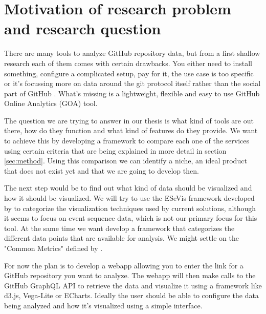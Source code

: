\documentclass[authoryear,preprint,review,12pt]{elsarticle}
\begin{document}
\begin{frontmatter}

\end{frontmatter}


\section{Motivation of research problem and research question}
\label{sec:motivation}

There are many tools to analyze GitHub repository data, but from a first shallow research each of
them comes with certain drawbacks. You either need to install something, configure a complicated
setup, pay for it, the use case is too specific or it's focussing more on data around the git
protocol itself rather than the social part of GitHub . What's missing is a lightweight, flexible
and easy to use GitHub Online Analytics (GOA) tool.

The question we are trying to answer in our thesis is what kind of tools are out there, how do they
function and what kind of features do they provide. We want to achieve this by developing a
framework to compare each one of the services using certain criteria that are being explained in
more detail in section \ref{sec:method}. Using this comparison we can identify a niche, an ideal
product that does not exist yet and that we are going to develop then.

The next step would be to find out what kind of data should be visualized and how it should be
visualized. We will try to use the ESeVis framework developed by
\citet{yeshchenkoSurveyApproachesEvent2022} to categorize the visualization techniques used by
current solutions, although it seems to focus on event sequence data, which is not our primary
focus for this tool. At the same time we want develop a framework that categorizes the different
data points that are available for analysis. We might settle on the "Common Metrics" defined by
\citet{CHAOSSCommonMetrics2022}.

For now the plan is to develop a webapp allowing you to enter the link for a GitHub repository you
want to analyze. The webapp will then make calls to the GitHub GraphQL API to retrieve the data and
visualize it using a framework like d3.js, Vega-Lite or ECharts. Ideally the user should be able to
configure the data being analyzed and how it's visualized using a simple interface.
\end{document}

